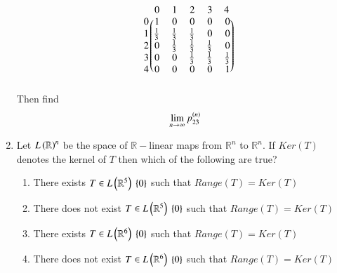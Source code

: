 \begin{enumerate}[label=\thesection.\arabic*.,ref=\thesection.\theenumi]
\begin{align}
\begin{blockarray}{c@{\hspace{1pt}}rrrrr@{\hspace{3pt}}}
         & 0   & 1   & 2 &3 & 4\\
        \begin{block}{r@{\hspace{3pt}}@{\hspace{1pt}}
    (@{\hspace{1pt}}rrrrr@{\hspace{1pt}}@{\hspace{1pt}})}
        0 & 1 & 0 & 0 & 0 & 0 \\
        1 & \frac{1}{3} & \frac{1}{3} & \frac{1}{3} & 0 & 0 \\
%
        2 & 0 & \frac{1}{3} & \frac{1}{3} & \frac{1}{3} & 0  \\
        3 & 0 & 0 & \frac{1}{3} & \frac{1}{3} & \frac{1}{3}   \\
        4 & 0 & 0 & 0 & 0 & 1 \\
        \end{block}
    \end{blockarray}
\end{align}
Then find 
\begin{align}
\lim_{n \to \infty} p_{23}^{\left(n\right)}
\end{align}
\item Let $L\left(\mathbb{R}\right)^n$ be the space of $\mathbb{R}-$linear maps from $\mathbb{R}^n$ to $\mathbb{R}^n$.  If $Ker(T)$ denotes the kernel of $T$ then which of the following are true?
\begin{enumerate}
\item There exists $T \in L\left(\mathbb{R}^5\right)\ \left\{0\right\}$ such that $Range(T) = Ker(T)$
\item There does not exist $T \in L\left(\mathbb{R}^5\right)\ \left\{0\right\}$ such that $Range(T) = Ker(T)$
\item There exists $T \in L\left(\mathbb{R}^6\right)\ \left\{0\right\}$ such that $Range(T) = Ker(T)$
\item There does not exist $T \in L\left(\mathbb{R}^6\right)\ \left\{0\right\}$ such that $Range(T) = Ker(T)$

\end{enumerate}
\end{enumerate}
